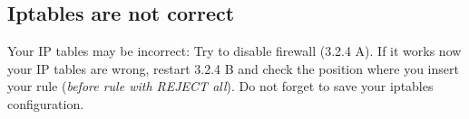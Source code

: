 \subsection{Iptables are not correct}
Your IP tables may be incorrect:
\newline
Try to disable firewall (3.2.4 A). If it works now your IP tables are wrong, restart 3.2.4 B
and check the position where you insert your rule (\emph{before rule with REJECT all}). Do not forget to save your iptables configuration.